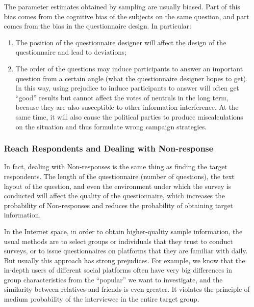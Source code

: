 \documentclass[
]{article}
\begin{document}
The parameter estimates obtained by sampling are usually biased. Part of
this bias comes from the cognitive bias of the subjects on the same
question, and part comes from the bias in the questionnaire design. In
particular:

\begin{enumerate}
\def\labelenumi{\arabic{enumi}.}
\item
  The position of the questionnaire designer will affect the design of
  the questionnaire and lead to deviations;
\item
  The order of the questions may induce participants to answer an
  important question from a certain angle (what the questionnaire
  designer hopes to get). In this way, using prejudice to induce
  participants to answer will often get ``good'' results but cannot
  affect the votes of neutrals in the long term, because they are also
  susceptible to other information interference. At the same time, it
  will also cause the political parties to produce miscalculations on
  the situation and thus formulate wrong campaign strategies.
\end{enumerate}

\hypertarget{reach-respondents-and-dealing-with-non-response}{%
\subsubsection{Reach Respondents and Dealing with
Non-response}\label{reach-respondents-and-dealing-with-non-response}}

In fact, dealing with Non-responses is the same thing as finding the
target respondents. The length of the questionnaire (number of
questions), the text layout of the question, and even the environment
under which the survey is conducted will affect the quality of the
questionnaire, which increases the probability of Non-responses and
reduces the probability of obtaining target information.

In the Internet space, in order to obtain higher-quality sample
information, the usual methods are to select groups or individuals that
they trust to conduct surveys, or to issue questionnaires on platforms
that they are familiar with daily. But usually this approach has strong
prejudices. For example, we know that the in-depth users of different
social platforms often have very big differences in group
characteristics from the ``popular'' we want to investigate, and the
similarity between relatives and friends is even greater. It violates
the principle of medium probability of the interviewee in the entire
target group.
\end{document}
